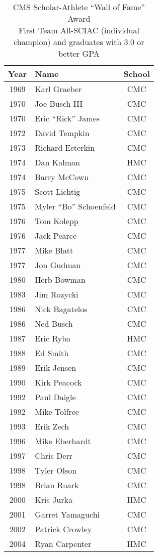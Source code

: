 \begin{table}[htbp]
\centering
\small
\caption*{CMS Scholar-Athlete ``Wall of Fame'' Award \\ 
First Team All-SCIAC (individual champion) and graduates with 3.0 or better GPA}
\begin{tabular}{c l c}
\toprule
Year & Name & School \\
\midrule
1969 & Karl Graeber & CMC \\
1970 & Joe Busch III & CMC \\
1970 & Eric ``Rick'' James & CMC \\
1972 & David Tempkin & CMC \\
1973 & Richard Esterkin & CMC \\
1974 & Dan Kalman & HMC \\
1974 & Barry McCown & CMC \\
1975 & Scott Lichtig & CMC \\
1975 & Myler ``Bo'' Schoenfeld & CMC \\
1976 & Tom Kolepp & CMC \\
1976 & Jack Pearce & CMC \\
1977 & Mike Blatt & CMC \\
1977 & Jon Gudman & CMC \\
1980 & Herb Bowman & CMC \\
1983 & Jim Rozycki & CMC \\
1986 & Nick Bagatelos & CMC \\
1986 & Ned Busch & CMC \\
1987 & Eric Ryba & HMC \\
1988 & Ed Smith & CMC \\
1989 & Erik Jensen & CMC \\
1990 & Kirk Peacock & CMC \\
1992 & Paul Daigle & CMC \\
1992 & Mike Tolfree & CMC \\
1993 & Erik Zech & CMC \\
1996 & Mike Eberhardt & CMC \\
1997 & Chris Derr & CMC \\
1998 & Tyler Olson & CMC \\
1998 & Brian Ruark & CMC \\
2000 & Kris Jurka & HMC \\
2001 & Garret Yamaguchi & CMC \\
2002 & Patrick Crowley & CMC \\
2004 & Ryan Carpenter & HMC \\

\end{tabular}
\end{table}
